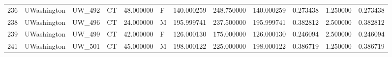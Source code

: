\begin{tabular}{llllrlrrrrrr}
236    &     UWashington &       UW\_492 &                 CT &  48.000000 &        F &       140.000259 &    248.750000 &  140.000259 &               0.273438 &            1.250000 &          0.273438 \\
238    &     UWashington &       UW\_496 &                 CT &  24.000000 &        M &       195.999741 &    237.500000 &  195.999741 &               0.382812 &            2.500000 &          0.382812 \\
239    &     UWashington &       UW\_499 &                 CT &  42.000000 &        F &       126.000130 &    175.000000 &  126.000130 &               0.246094 &            2.500000 &          0.246094 \\
241    &     UWashington &       UW\_501 &                 CT &  45.000000 &        M &       198.000122 &    225.000000 &  198.000122 &               0.386719 &            1.250000 &          0.386719 \\
\bottomrule
\end{tabular}
